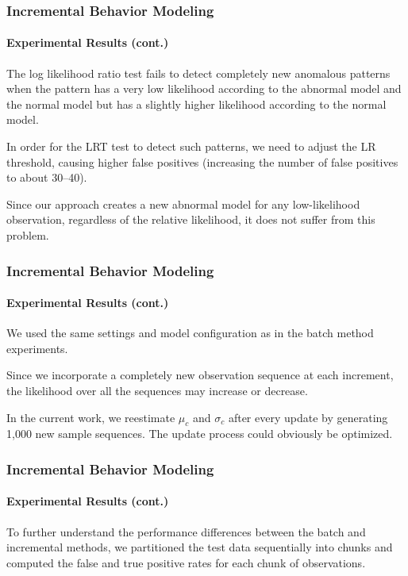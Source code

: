 
\begin{frame}
    \frametitle{Incremental Behavior Modeling}
    \framesubtitle{Experimental Results (cont.)}
    
    The log likelihood ratio test fails to detect completely new anomalous
    patterns when the pattern has a very low likelihood according to the
    abnormal model and the normal model but has a slightly higher
    likelihood according to the normal model. 
    
    \bigskip
    
    In order for the LRT test to
    detect such patterns, we need to adjust the LR threshold, causing
    higher false positives (increasing the number of false positives to
    about 30--40).  
    
    \bigskip
    
    Since our approach creates a new abnormal model for
    any low-likelihood observation, regardless of the relative likelihood,
    it does not suffer from this problem.
    
\end{frame}


\begin{frame}
    \frametitle{Incremental Behavior Modeling}
    \framesubtitle{Experimental Results (cont.)}
    
    We used the same settings and model configuration as in the batch 
    method experiments.
   
    \bigskip

    Since we incorporate a completely new observation sequence at each 
    increment, the likelihood over all the sequences may increase or 
    decrease. 
    
    \bigskip
    
    In the current work, we reestimate $\mu_c$ and $\sigma_c$ after every 
    update by generating 1,000 new sample sequences.  The update process 
    could obviously be optimized.

\end{frame}


\begin{frame}
    \frametitle{Incremental Behavior Modeling}
    \framesubtitle{Experimental Results (cont.)}

    To further understand the performance differences between the batch
    and incremental methods, we partitioned the test data sequentially
    into chunks and computed the false and true positive rates for each
    chunk of observations.  
    
\end{frame}



